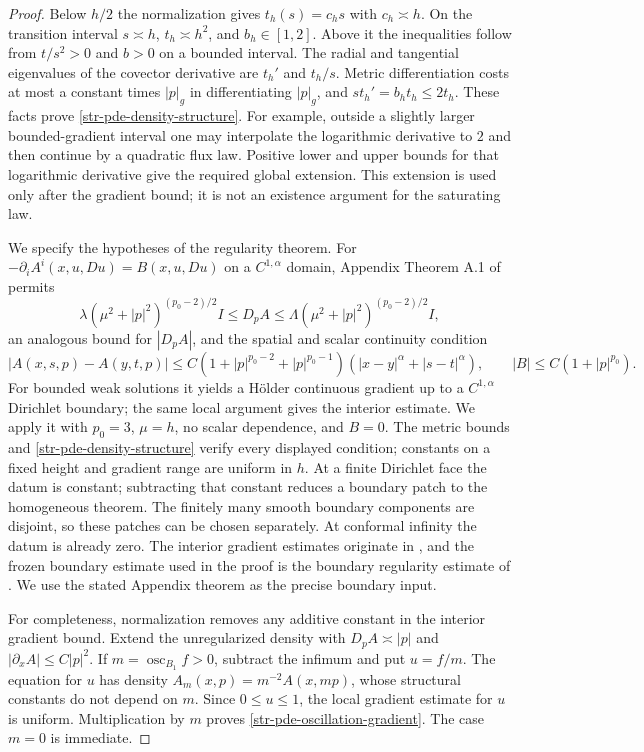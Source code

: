 \begin{proof}
Below $h/2$ the normalization gives $t_h(s)=c_hs$ with
$c_h\asymp h$. On the transition interval $s\asymp h$,
$t_h\asymp h^2$, and $b_h\in[1,2]$. Above it the inequalities
follow from $t/s^2>0$ and $b>0$ on a bounded interval.
The radial and tangential eigenvalues of the covector derivative
are $t_h'$ and $t_h/s$. Metric differentiation costs at most a
constant times $|p|_g$ in differentiating $|p|_g$, and
$s t_h'=b_h t_h\leq2t_h$. These facts prove
\eqref{str-pde-density-structure}.
For example, outside a slightly larger bounded-gradient interval
one may interpolate the logarithmic derivative to $2$ and then
continue by a quadratic flux law. Positive lower and upper bounds
for that logarithmic derivative give the required global extension.
This extension is used only after the gradient bound; it is not an
existence argument for the saturating law.

We specify the hypotheses of the regularity theorem.
For $-\partial_i A^i(x,u,Du)=B(x,u,Du)$ on a $C^{1,\alpha}$
domain, Appendix Theorem A.1 of \cite{porrettaveron2009} permits
\[
 \lambda(\mu^2+|p|^2)^{(p_0-2)/2}I
 \leq D_pA\leq
 \Lambda(\mu^2+|p|^2)^{(p_0-2)/2}I,
\]
an analogous bound for $|D_pA|$, and the spatial and scalar
continuity condition
\[
 |A(x,s,p)-A(y,t,p)|
 \leq C(1+|p|^{p_0-2}+|p|^{p_0-1})
       (|x-y|^\alpha+|s-t|^\alpha),
 \qquad |B|\leq C(1+|p|^{p_0}).
\]
For bounded weak solutions it yields a H\"older continuous gradient
up to a $C^{1,\alpha}$ Dirichlet boundary; the same local argument
gives the interior estimate. We apply it with $p_0=3$, $\mu=h$,
no scalar dependence, and $B=0$. The metric bounds and
\eqref{str-pde-density-structure} verify every displayed condition;
constants on a fixed height and gradient range are uniform in $h$.
At a finite Dirichlet face the datum is constant; subtracting that
constant reduces a boundary patch to the homogeneous theorem.
The finitely many smooth boundary components are disjoint, so
these patches can be chosen separately. At conformal infinity
the datum is already zero.
The interior gradient estimates originate in
\cite{tolksdorf1984}, and the frozen boundary estimate used in the
proof is the boundary regularity estimate of \cite{lieberman1988}.
We use the stated Appendix theorem as the precise boundary input.

For completeness, normalization removes any additive constant in
the interior gradient bound. Extend the unregularized density with
$D_pA\asymp|p|$ and $|\partial_xA|\leq C|p|^2$. If
$m=\operatorname{osc}_{B_1}f>0$, subtract the infimum and put
$u=f/m$. The equation for $u$ has density
$A_m(x,p)=m^{-2}A(x,mp)$, whose structural constants do not depend
on $m$. Since $0\leq u\leq1$, the local gradient estimate for $u$
is uniform. Multiplication by $m$ proves
\eqref{str-pde-oscillation-gradient}. The case $m=0$ is immediate.
\end{proof}

